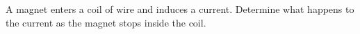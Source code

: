 A magnet enters a coil of wire and induces a current. 
Determine what happens to the current as the magnet stops inside the coil. %